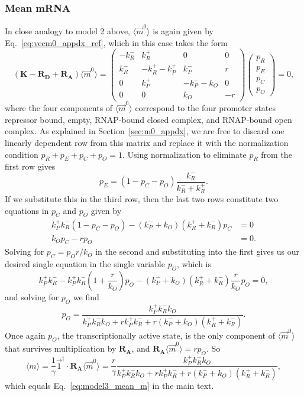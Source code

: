 \subsubsection{Mean mRNA}
In close analogy to model 2 above, $\langle\vec{m}^0\rangle$ is again given by
Eq.~\ref{eq:vecm0_appdx_ref}, which in this case takes the form
\begin{equation}
(\mathbf{K} - \mathbf{R_D} + \mathbf{R_A}) \langle\vec{m}^0\rangle =
\begin{pmatrix} -k_R^- & k_R^+ & 0 & 0\\
    k_R^- & -k_R^+ -k_P^+ & k_P^- & r \\
    0 & k_P^+ & -k_P^- - k_O & 0 \\
    0 & 0 & k_O & - r
\end{pmatrix}
\begin{pmatrix} p_R \\ p_E \\ p_C \\ p_O
\end{pmatrix} = 0,
\end{equation}
where the four components of $\langle\vec{m}^0\rangle$ correspond to the four
promoter states repressor bound, empty, RNAP-bound closed complex, and
RNAP-bound open complex. As explained in Section~\ref{sec:m0_appdx}, we are free
to discard one linearly dependent row from this matrix and replace it with the
normalization condition $p_R + p_E + p_C + p_O = 1$. Using normalization to
eliminate $p_R$ from the first row gives
\begin{equation}
p_E = (1 - p_C - p_O)\frac{k_R^-}{k_R^- + k_R^+}.
\end{equation}
If we substitute this in the third row, then the last two rows constitute two
equations in $p_C$ and $p_O$ given by
\begin{align}
k_P^+k_R^-(1-p_C-p_O) - (k_P^- + k_O)(k_R^+ + k_R^-) p_C &= 0
\\
k_O p_C - r p_O &= 0.
\end{align}
Solving for $p_C = p_O r/k_O$ in the second and substituting into the first
gives us our desired single equation in the single variable $p_O$, which is
\begin{equation}
k_P^+k_R^- - k_P^+k_R^-\left(1 + \frac{r}{k_O}\right)p_O
            - (k_P^- + k_O)(k_R^+ + k_R^-) \frac{r}{k_O}p_O = 0,
\end{equation}
and solving for $p_O$ we find
\begin{equation}
p_O = \frac{k_P^+ k_R^- k_O}{k_P^+ k_R^- k_O + r k_P^+ k_R^- +
                            r (k_P^- + k_O) (k_R^+ + k_R^-)}.
\label{eq:model3_pO}
\end{equation}
Once again $p_O$, the transcriptionally active state, is the only component of
$\langle\vec{m}^0\rangle$ that survives multiplication by $\mathbf{R_A}$, and
$\mathbf{R_A}\langle\vec{m}^0\rangle = r p_O$. So
\begin{equation}
\langle{m}\rangle =
    \frac{1}{\gamma}\vec{1}^\dagger\cdot\mathbf{R_A}\langle\vec{m}^0\rangle
= \frac{r}{\gamma}
    \frac{k_P^+ k_R^- k_O}{k_P^+ k_R^- k_O + r k_P^+ k_R^- +
                            r (k_P^- + k_O) (k_R^+ + k_R^-)},
\end{equation}
which equals Eq.~\ref{eq:model3_mean_m} in the main text.

